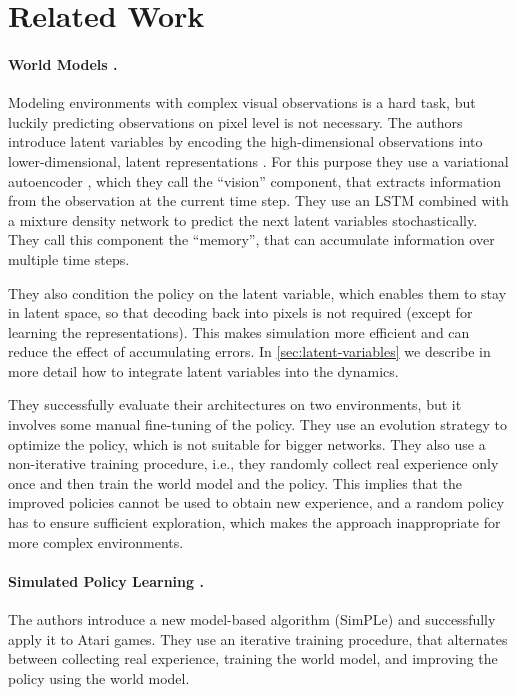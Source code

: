 \documentclass{article}
\begin{document}
\clearpage

\section{Related Work}

\paragraph{World Models \citep{world-models}.}
Modeling environments with complex visual observations is a hard task, but
luckily predicting observations on pixel level is not necessary. The authors
introduce latent variables by encoding the high-dimensional observations 
into lower-dimensional, latent representations . For this purpose they use
a variational autoencoder \citep{vae}, which they call the ``vision''
component, that extracts information from the observation at the current time
step. They use an LSTM combined with a mixture density network \citep{mdn} to
predict the next latent variables stochastically. They call this component the
``memory'', that can accumulate information over multiple time steps.

They also condition the policy on the latent variable, which enables them to
stay in latent space, so that decoding back into pixels is not required (except
for learning the representations). This makes simulation more efficient and can
reduce the effect of accumulating errors. In \cref{sec:latent-variables} we
describe in more detail how to integrate latent variables into the dynamics.

They successfully evaluate their architectures on two environments, but it
involves some manual fine-tuning of the policy. They use an evolution strategy
to optimize the policy, which is not suitable for bigger networks. They also use
a non-iterative training procedure, i.e., they randomly collect real experience
only once and then train the world model and the policy. This implies that the
improved policies cannot be used to obtain new experience, and a random policy
has to ensure sufficient exploration, which makes the approach inappropriate for
more complex environments.

\paragraph{Simulated Policy Learning \citep{simple}.}
The authors introduce a new model-based algorithm (SimPLe) and successfully
apply it to Atari games. They use an iterative training procedure, that
alternates between collecting real experience, training the world model, and
improving the policy using the world model.
\end{document}
